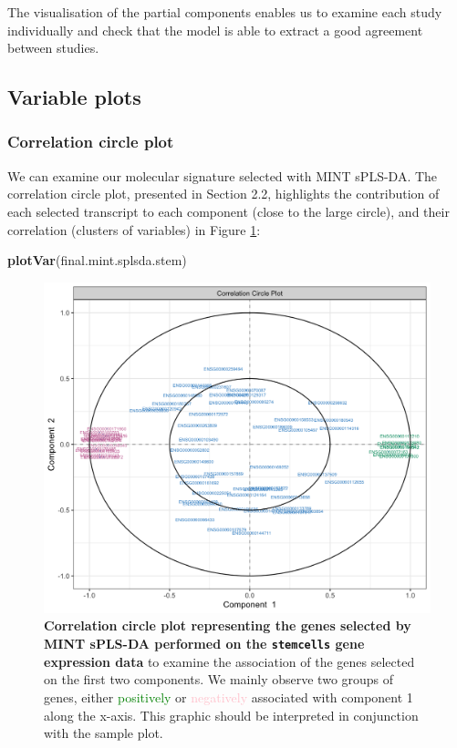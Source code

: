 \documentclass[]{book}
\newenvironment{Shaded}{\begin{snugshade}}{\end{snugshade}}
\newcommand{\KeywordTok}[1]{\textcolor[rgb]{0.13,0.29,0.53}{\textbf{#1}}}
\newcommand{\NormalTok}[1]{#1}
\begin{document}
The visualisation of the partial components enables us to examine each
study individually and check that the model is able to extract a good
agreement between studies.

\subsection{Variable plots}\label{mint:result:varplot}

\subsubsection{Correlation circle plot}\label{correlation-circle-plot}

We can examine our molecular signature selected with MINT sPLS-DA. The
correlation circle plot, presented in Section 2.2, highlights the
contribution of each selected transcript to each component (close to the
large circle), and their correlation (clusters of variables) in Figure
\ref{fig:MINT-var-col}:

\begin{Shaded}
\begin{Highlighting}[]
\KeywordTok{plotVar}\NormalTok{(final.mint.splsda.stem)}
\end{Highlighting}
\end{Shaded}

\begin{figure}

{\centering \includegraphics[width=0.5\linewidth]{Figures/MINT/MINT-var-col-1} 

}

\caption{\textbf{Correlation circle plot representing the
genes selected by MINT sPLS-DA performed on the \texttt{stemcells} gene
expression data} to examine the association of the genes selected on the
first two components. We mainly observe two groups of genes, either
\textcolor{green}{positively} or \textcolor{pink}{negatively} associated
with component 1 along the x-axis. This graphic should be interpreted in
conjunction with the sample plot.}\label{fig:MINT-var-col}
\end{figure}
\end{document}
